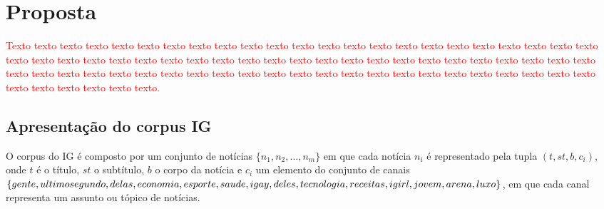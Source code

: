 \documentclass[normaltoc, espacoumemeio, pnumromarab,ruledheader]{abnt}
\begin{document}
\chapter{Proposta}




\textcolor{red}{Texto texto texto texto texto texto texto texto texto texto texto texto texto texto texto texto texto texto texto texto texto texto texto texto texto texto texto texto texto texto texto texto texto texto texto texto texto texto texto texto texto texto texto texto texto texto texto texto texto texto texto texto texto texto texto texto texto texto texto texto texto texto texto texto texto texto texto texto texto texto texto texto texto texto texto.}

\section{Apresentação do corpus IG}


O corpus do IG é composto por um conjunto de notícias $\{ n_1, n_2, \dots, n_m \}$ em que cada notícia $n_i$ é representado pela tupla $(t, st, b, c_i)$, onde $t$ é o título, $st$ o subtítulo, $b$ o corpo da notícia e $c_i$ um elemento do conjunto de canais $\{ gente , ultimosegundo , delas , \\economia , esporte , saude , igay , deles , tecnologia , receitas , igirl , jovem , arena , luxo \}$, em que cada canal representa um assunto ou tópico de notícias.

\end{document}
